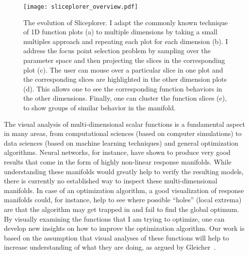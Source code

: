 


\begin{figure}[ht]
  \centering
  \texttt{[image: sliceplorer\_overview.pdf]}
  \caption[The evolution of Sliceplorer.]{%
    The evolution of Sliceplorer. I adapt the commonly known technique of
    1D function plots (a) to
    multiple dimensions by taking a small multiples approach and repeating each
    plot for each dimension (b). I address the
    focus point selection problem by sampling over the parameter space and then
    projecting the slices in the corresponding plot
    (c). The user can mouse over a particular
    slice in one plot and the corresponding slices are highlighted in the other
    dimension plots (d). This allows one to
    see the corresponding function behaviors in the other dimensions.  Finally,
    one can cluster the function slices (e), to
    show groups of similar behavior in the manifold.
  }
  \label{fig:walkthrough}
\end{figure}


The visual analysis of multi-dimensional scalar functions is a fundamental aspect in many areas, from computational sciences (based on computer simulations) to data sciences (based on machine learning techniques) and general optimization algorithms. 
Neural networks, for instance, have shown to produce very good results that come in the form of highly non-linear response manifolds.
While understanding these manifolds would greatly help to verify
the resulting models, there
is currently no established way to inspect these multi-dimensional manifolds. 
In case of an optimization algorithm, a good visualization of response manifolds could, for instance, help to see where possible
``holes'' (local extrema) are that the algorithm may get trapped in and fail to find the
global optimum. By visually examining the functions that I am trying to
optimize, one can develop new insights on how to improve the optimization
algorithm. Our work is based on the assumption that visual analyses of these functions will help to increase
understanding of what they are doing, 
as argued by Gleicher~\cite{gleicher:2016}.

